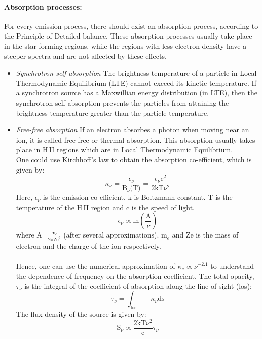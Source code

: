 \documentclass[../main/thesis_msc.tex]{subfiles}
\begin{document}
\paragraph{Absorption processes:}
For every emission process, there should exist an absorption process, according to the Principle of Detailed balance. These absorption processes usually take place in the star forming regions, while the regions with less electron density have a steeper spectra and are not affected by these effects.
\begin{itemize}
\item \textit{Synchrotron self-absorption} The brightness temperature of a particle in Local Thermodynamic Equilibrium (LTE) cannot exceed its kinetic temperature. If a synchrotron source has a Maxwillian energy distribution (in LTE), then the synchrotron self-absorption prevents the particles from attaining the brightness temperature greater than the particle temperature.
\item \textit{Free-free absorption} If an electron absorbes a photon when moving near an ion, it is called free-free or thermal absorption. This absorption usually takes place in H\,II regions which are in Local Thermodynamic Equilibrium. \\
One could use Kirchhoff's law to obtain the absorption co-efficient, which is given by:
\begin{equation}
\kappa_{\nu} = \frac{\epsilon_{\nu}}{\textrm{B}_{\nu}\textrm{(T)}} = \frac{\epsilon_{\nu} \textrm{c}^2}{2\textrm{kT}\nu^2}
\end{equation}
Here, $\epsilon_{\nu}$ is the emission co-efficient, k is Boltzmann constant. T is the temperature of the H\,II region and c is the speed of light. 
\begin{equation}
\epsilon_{\nu} \propto \textrm{ln}\left(\frac{\text{A}}{\nu}\right)
\end{equation}
where A=$\frac{\textrm{m}_e}{2\pi\textrm{Ze}^2}$ (after several approximations). m$_e$ and Ze is the mass of electron and the charge of the ion respectively. \\ \\
Hence, one can use the numerical approximation of $\kappa_{\nu} \propto \nu^{-2.1}$ to understand the dependence of frequency on the absorption coefficient. The total opacity, $\tau_{\nu}$ is the integral of the coefficient of absorption along the line of sight (los):
\begin{equation}
\tau_{\nu} = \int_{\textrm{los}}-\kappa_{\nu} \textrm{ds}
\end{equation}
The flux density of the source is given by:
\begin{equation}
\textrm{S}_{\nu} \propto \frac{2\textrm{kT}\nu^2}{\textrm{c}}\tau_{\nu}
\end{equation}


\end{itemize}
\end{document}
